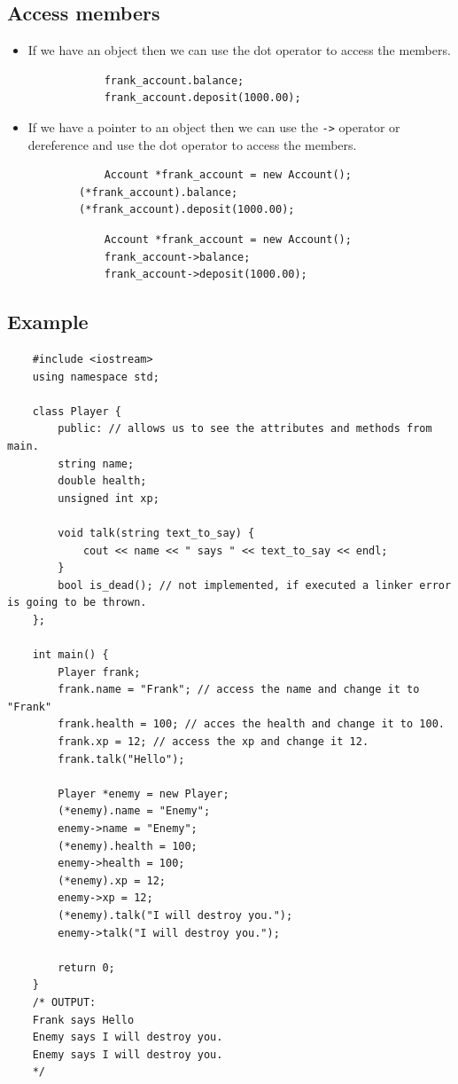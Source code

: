 \subsection{Access members}
\begin{itemize}
    \item If we have an object then we can use the dot operator to access the members.
        \begin{verbatim}
            frank_account.balance;
            frank_account.deposit(1000.00);
        \end{verbatim}
    
    \item If we have a pointer to an object then we can use the \texttt{->} operator or dereference and use the dot operator to access the members.
        \begin{verbatim}
            Account *frank_account = new Account();
        (*frank_account).balance;
        (*frank_account).deposit(1000.00);
        \end{verbatim}
        \begin{verbatim}
            Account *frank_account = new Account();
            frank_account->balance;
            frank_account->deposit(1000.00);
        \end{verbatim}
\end{itemize}

\subsection{Example}
\begin{verbatim}
    #include <iostream>
    using namespace std;

    class Player {
        public: // allows us to see the attributes and methods from main.
        string name;
        double health;
        unsigned int xp;

        void talk(string text_to_say) {
            cout << name << " says " << text_to_say << endl;
        }
        bool is_dead(); // not implemented, if executed a linker error is going to be thrown.
    };

    int main() {
        Player frank;
        frank.name = "Frank"; // access the name and change it to "Frank"
        frank.health = 100; // acces the health and change it to 100.
        frank.xp = 12; // access the xp and change it 12.
        frank.talk("Hello");

        Player *enemy = new Player;
        (*enemy).name = "Enemy";
        enemy->name = "Enemy";
        (*enemy).health = 100;
        enemy->health = 100;
        (*enemy).xp = 12;
        enemy->xp = 12;
        (*enemy).talk("I will destroy you.");
        enemy->talk("I will destroy you.");
        
        return 0;
    }
    /* OUTPUT:
    Frank says Hello
    Enemy says I will destroy you.
    Enemy says I will destroy you.
    */
\end{verbatim}


